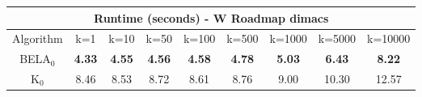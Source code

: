 \begin{tabular}{c|cccccccc}\toprule
\multicolumn{9}{c}{Runtime (seconds) - W Roadmap dimacs}\\ \midrule
Algorithm & k=1 & k=10 & k=50 & k=100 & k=500 & k=1000 & k=5000 & k=10000 \\ \midrule
BELA$_0$ & \textbf{4.33} & \textbf{4.55} & \textbf{4.56} & \textbf{4.58} & \textbf{4.78} & \textbf{5.03} & \textbf{6.43} & \textbf{8.22} \\
K$_0$ & 8.46 & 8.53 & 8.72 & 8.61 & 8.76 & 9.00 & 10.30 & 12.57 \\ \bottomrule 
\end{tabular}
